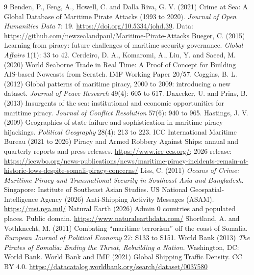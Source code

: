 \documentclass[11pt,a4paper]{article}
\begin{document}
\begin{thebibliography}{9}
 Benden, P., Feng, A., Howell, C. and Dalla Riva, G. V. (2021) Crime at Sea: A Global Database of Maritime Pirate Attacks (1993 to 2020). \emph{Journal of Open Humanities Data} 7: 19. \url{https://doi.org/10.5334/johd.39}. Data: \url{https://github.com/newzealandpaul/Maritime-Pirate-Attacks}
 Bueger, C. (2015) Learning from piracy: future challenges of maritime security governance. \emph{Global Affairs} 1(1): 33 to 42.
 Cerdeiro, D. A., Komaromi, A., Liu, Y. and Saeed, M. (2020) World Seaborne Trade in Real Time: A Proof of Concept for Building AIS-based Nowcasts from Scratch. IMF Working Paper 20/57.
 Coggins, B. L. (2012) Global patterns of maritime piracy, 2000 to 2009: introducing a new dataset. \emph{Journal of Peace Research} 49(4): 605 to 617.
 Daxecker, U. and Prins, B. (2013) Insurgents of the sea: institutional and economic opportunities for maritime piracy. \emph{Journal of Conflict Resolution} 57(6): 940 to 965.
 Hastings, J. V. (2009) Geographies of state failure and sophistication in maritime piracy hijackings. \emph{Political Geography} 28(4): 213 to 223.
 ICC International Maritime Bureau (2021 to 2026) Piracy and Armed Robbery Against Ships: annual and quarterly reports and press releases. \url{https://www.icc-ccs.org/}; 2026 release: \url{https://iccwbo.org/news-publications/news/maritime-piracy-incidents-remain-at-historic-lows-despite-somali-piracy-concerns/}
 Liss, C. (2011) \emph{Oceans of Crime: Maritime Piracy and Transnational Security in Southeast Asia and Bangladesh}. Singapore: Institute of Southeast Asian Studies.
 US National Geospatial-Intelligence Agency (2026) Anti-Shipping Activity Messages (ASAM). \url{https://msi.nga.mil/}
 Natural Earth (2026) Admin 0 countries and populated places. Public domain. \url{https://www.naturalearthdata.com/}
 Shortland, A. and Vothknecht, M. (2011) Combating ``maritime terrorism'' off the coast of Somalia. \emph{European Journal of Political Economy} 27: S133 to S151.
 World Bank (2013) \emph{The Pirates of Somalia: Ending the Threat, Rebuilding a Nation}. Washington, DC: World Bank.
 World Bank and IMF (2021) Global Shipping Traffic Density. CC BY 4.0. \url{https://datacatalog.worldbank.org/search/dataset/0037580}
\end{thebibliography}
\end{document}

